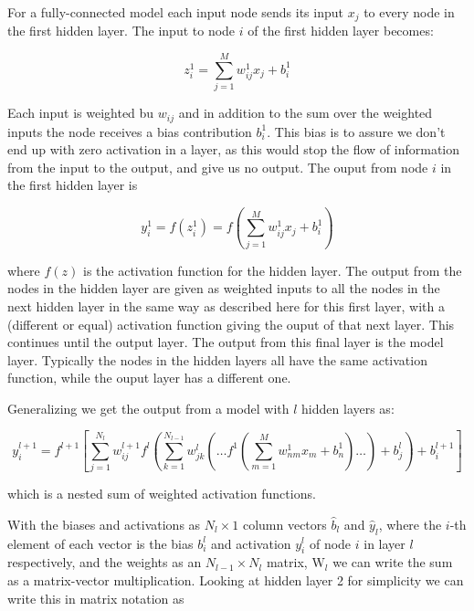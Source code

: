 \documentclass[11pt]{article}
\begin{document}
For a fully-connected model each input node sends its input \(x_j\) to
every node in the first hidden layer. The input to node \(i\) of the
first hidden layer becomes:


\begin{equation} z_i^1 = \sum_{j=1}^{M} w_{ij}^1 x_j + b_i^1
\end{equation}


    Each input is weighted bu \(w_{ij}\) and in addition to the sum over the
weighted inputs the node receives a bias contribution \(b_i^1\). This
bias is to assure we don't end up with zero activation in a layer, as
this would stop the flow of information from the input to the output,
and give us no output. The ouput from node \(i\) in the first hidden
layer is


\begin{equation}
 y_i^1 = f(z_i^1) = f\left(\sum_{j=1}^M w_{ij}^1 x_j  + b_i^1\right)
\end{equation}


where \(f(z)\) is the activation function for the hidden layer. The
output from the nodes in the hidden layer are given as weighted inputs
to all the nodes in the next hidden layer in the same way as described
here for this first layer, with a (different or equal) activation
function giving the ouput of that next layer. This continues until the
output layer. The output from this final layer is the model layer.
Typically the nodes in the hidden layers all have the same activation
function, while the ouput layer has a different one.

Generalizing we get the output from a model with \(l\) hidden layers as:


\begin{equation}
y^{l+1}_i = f^{l+1}\left[\!\sum_{j=1}^{N_l} w_{ij}^{l+1} f^l\left(\sum_{k=1}^{N_{l-1}}w_{jk}^{l}\left(\dots f^1\left(\sum_{m=1}^{M} w_{nm}^1 x_m+ b_n^1\right)\dots\right)+b_j^{l}\right)+b_i^{l+1}\right] 
\end{equation}


which is a nested sum of weighted activation functions.

With the biases and activations as \(N_l \times 1\) column vectors
\(\hat{b}_l\) and \(\hat{y}_l\), where the \(i\)-th element of each
vector is the bias \(b_i^l\) and activation \(y_i^l\) of node \(i\) in
layer \(l\) respectively, and the weights as an \(N_{l-1} \times N_l\)
matrix, \(\mathrm{W}_l\) we can write the sum as a matrix-vector
multiplication. Looking at hidden layer 2 for simplicity we can write
this in matrix notation as
\end{document}
